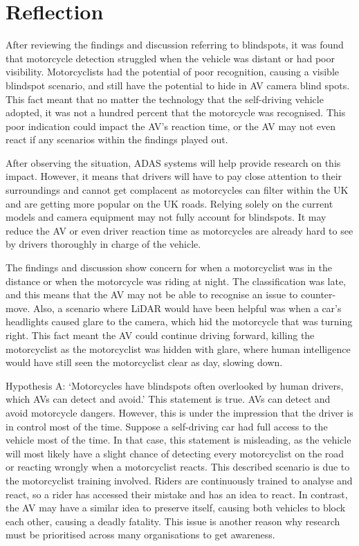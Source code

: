 \documentclass[12pt]{report} %
\begin{document}
\chapter{Reflection}
\label{chap:reflection}
	After reviewing the findings and discussion referring to blindspots, it was found that motorcycle detection struggled when the vehicle was distant or had poor visibility. Motorcyclists had the potential of poor recognition, causing a visible blindspot scenario, and still have the potential to hide in AV camera blind spots. This fact meant that no matter the technology that the self-driving vehicle adopted, it was not a hundred percent that the motorcycle was recognised. This poor indication could impact the AV's reaction time, or the AV may not even react if any scenarios within the findings played out. 
		
	After observing the situation, ADAS systems will help provide research on this impact. However, it means that drivers will have to pay close attention to their surroundings and cannot get complacent as motorcycles can filter within the UK and are getting more popular on the UK roads. Relying solely on the current models and camera equipment may not fully account for blindspots. It may reduce the AV or even driver reaction time as motorcycles are already hard to see by drivers thoroughly in charge of the vehicle.

	The findings and discussion show concern for when a motorcyclist was in the distance or when the motorcycle was riding at night. The classification was late, and this means that the AV may not be able to recognise an issue to counter-move. Also, a scenario where LiDAR would have been helpful was when a car's headlights caused glare to the camera, which hid the motorcycle that was turning right. This fact meant the AV could continue driving forward, killing the motorcyclist as the motorcyclist was hidden with glare, where human intelligence would have still seen the motorcyclist clear as day, slowing down.

	Hypothesis A: `Motorcycles have blindspots often overlooked by human drivers, which AVs can detect and avoid.' This statement is true. AVs can detect and avoid motorcycle dangers. However, this is under the impression that the driver is in control most of the time. Suppose a self-driving car had full access to the vehicle most of the time. In that case, this statement is misleading, as the vehicle will most likely have a slight chance of detecting every motorcyclist on the road or reacting wrongly when a motorcyclist reacts. This described scenario is due to the motorcyclist training involved. Riders are continuously trained to analyse and react, so a rider has accessed their mistake and has an idea to react. In contrast, the AV may have a similar idea to preserve itself, causing both vehicles to block each other, causing a deadly fatality. This issue is another reason why research must be prioritised across many organisations to get awareness. 
\end{document}
